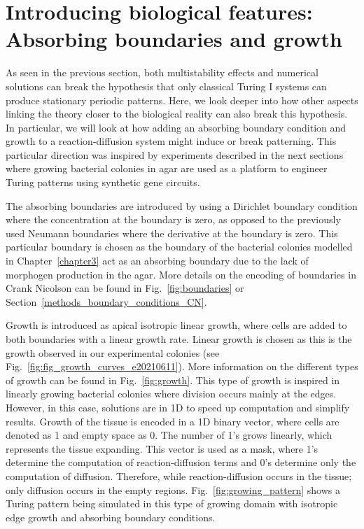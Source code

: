 \section{Introducing biological features: Absorbing boundaries and growth}
As seen in the previous section, both multistability effects and numerical solutions can break the hypothesis that only classical Turing I systems can produce stationary periodic patterns.
Here, we look deeper into how other aspects linking the theory closer to the biological reality can also break this hypothesis.
In particular, we will look at how adding an absorbing boundary condition and growth to a reaction-diffusion system might induce or break patterning.
This particular direction was inspired by experiments described in the next sections where growing bacterial colonies in agar are used as a platform to engineer Turing patterns using synthetic gene circuits.

The absorbing boundaries are introduced by using a Dirichlet boundary condition where the concentration at the boundary is zero, as opposed to the previously used Neumann boundaries where the derivative at the boundary is zero.
This particular boundary is chosen as the boundary of the bacterial colonies modelled in Chapter~\ref{chapter3} act as an absorbing boundary due to the lack of morphogen production in the agar.
More details on the encoding of boundaries in Crank Nicolson can be found in Fig.~\ref{fig:boundaries} or Section~\ref{methods_boundary_conditions_CN}.

Growth is introduced as apical isotropic linear growth, where cells are added to both boundaries with a linear growth rate.
Linear growth is chosen as this is the growth observed in our experimental colonies (see Fig.~\ref{fig:fig_growth_curves_e20210611}).
More information on the different types of growth can be found in Fig.~\ref{fig:growth}.
This type of growth is inspired in linearly growing bacterial colonies where division occurs mainly at the edges.
However, in this case, solutions are in 1D to speed up computation and simplify results.
Growth of the tissue is encoded in a 1D binary vector, where cells are denoted as 1 and empty space as 0.
The number of 1's grows linearly, which represents the tissue expanding.
This vector is used as a mask, where 1's determine the computation of reaction-diffusion terms and 0's determine only the computation of diffusion.
Therefore, while reaction-diffusion occurs in the tissue; only diffusion occurs in the empty regions.
Fig.~\ref{fig:growing_pattern} shows a Turing pattern being simulated in this type of growing domain with isotropic edge growth and absorbing boundary conditions.

